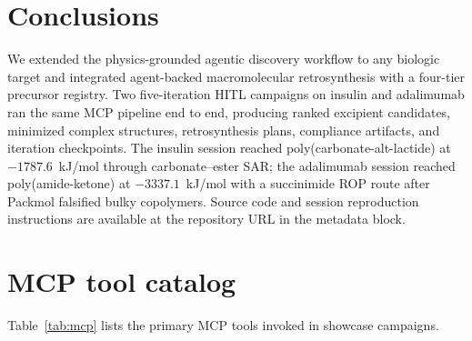 \documentclass[twocolumn]{fairmeta}
\begin{document}
\section{Conclusions}

We extended the physics-grounded agentic discovery workflow to any biologic target and integrated agent-backed macromolecular retrosynthesis with a four-tier precursor registry.
Two five-iteration HITL campaigns on insulin and adalimumab ran the same MCP pipeline end to end, producing ranked excipient candidates, minimized complex structures, retrosynthesis plans, compliance artifacts, and iteration checkpoints.
The insulin session reached poly(carbonate-alt-lactide) at $-1787.6$~kJ/mol through carbonate--ester SAR; the adalimumab session reached poly(amide-ketone) at $-3337.1$~kJ/mol with a succinimide ROP route after Packmol falsified bulky copolymers.
Source code and session reproduction instructions are available at the repository URL in the metadata block.




\appendix
\section{MCP tool catalog}
\label{app:mcp}

Table~\ref{tab:mcp} lists the primary MCP tools invoked in showcase campaigns.
\end{document}
